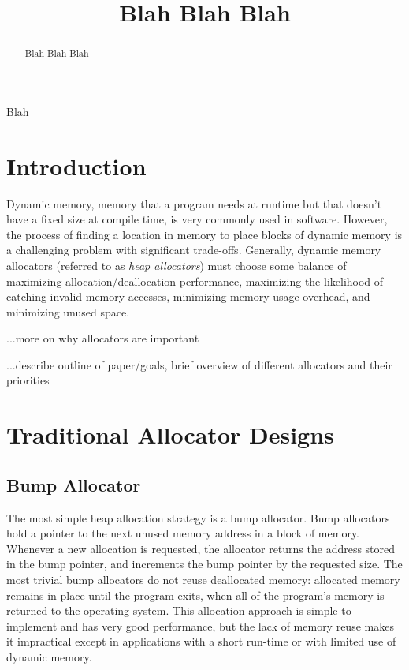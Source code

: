 \documentclass[conference]{IEEEtran}
\begin{document}
\title{\color{red}Blah Blah Blah}

\author{
}

\maketitle

\begin{abstract}
	\color{red} Blah Blah Blah
\end{abstract}

\begin{IEEEkeywords}
	\color{red} Blah
\end{IEEEkeywords}

\section{Introduction}
Dynamic memory, memory that a program needs at runtime but that doesn't have a fixed size at compile time, is very commonly used in software.
However, the process of finding a location in memory to place blocks of dynamic memory is a challenging problem with significant trade-offs.
Generally, dynamic memory allocators (referred to as \emph{heap allocators}) must choose some balance of maximizing allocation/deallocation performance, maximizing the likelihood of catching invalid memory accesses, minimizing memory usage overhead, and minimizing unused space.

	{\color{red}...more on why allocators are important}

	{\color{red}...describe outline of paper/goals, brief overview of different allocators and their priorities}

\section{Traditional Allocator Designs}

\subsection{Bump Allocator}

The most simple heap allocation strategy is a bump allocator.
Bump allocators hold a pointer to the next unused memory address in a block of memory.
Whenever a new allocation is requested, the allocator returns the address stored in the bump pointer, and increments the bump pointer by the requested size.
The most trivial bump allocators do not reuse deallocated memory: allocated memory remains in place until the program exits, when all of the program's memory is returned to the operating system.
This allocation approach is simple to implement and has very good performance, but the lack of memory reuse makes it impractical except in applications with a short run-time or with limited use of dynamic memory.
\end{document}
